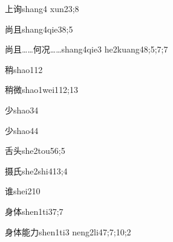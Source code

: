 \begin{verbete}{上询}{shang4 xun2}{3;8}
\end{verbete}

\begin{verbete}{尚且}{shang4qie3}{8;5}
\end{verbete}

\begin{verbete}{尚且……何况……}{shang4qie3 he2kuang4}{8;5;7;7}
\end{verbete}

\begin{verbete}{稍}{shao1}{12}
\end{verbete}

\begin{verbete}{稍微}{shao1wei1}{12;13}
\end{verbete}

\begin{verbete}{少}{shao3}{4}
\end{verbete}

\begin{verbete}{少}{shao4}{4}
\end{verbete}

\begin{verbete}{舌头}{she2tou5}{6;5}
\end{verbete}

\begin{verbete}{摄氏}{she2shi4}{13;4}
\end{verbete}

\begin{verbete}{谁}{shei2}{10}
\end{verbete}

\begin{verbete}{身体}{shen1ti3}{7;7}
\end{verbete}

\begin{verbete}{身体能力}{shen1ti3 neng2li4}{7;7;10;2}
\end{verbete}

